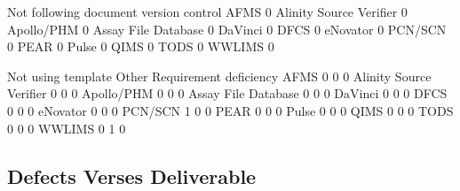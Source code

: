 \documentclass{article}
\begin{document}
\begin{Schunk}
\begin{Soutput}
                          Not following document version control
  AFMS                                                         0
  Alinity Source Verifier                                      0
  Apollo/PHM                                                   0
  Assay File Database                                          0
  DaVinci                                                      0
  DFCS                                                         0
  eNovator                                                     0
  PCN/SCN                                                      0
  PEAR                                                         0
  Pulse                                                        0
  QIMS                                                         0
  TODS                                                         0
  WWLIMS                                                       0
                         
                          Not using template Other Requirement deficiency
  AFMS                                     0     0                      0
  Alinity Source Verifier                  0     0                      0
  Apollo/PHM                               0     0                      0
  Assay File Database                      0     0                      0
  DaVinci                                  0     0                      0
  DFCS                                     0     0                      0
  eNovator                                 0     0                      0
  PCN/SCN                                  1     0                      0
  PEAR                                     0     0                      0
  Pulse                                    0     0                      0
  QIMS                                     0     0                      0
  TODS                                     0     0                      0
  WWLIMS                                   0     1                      0
\end{Soutput}
\end{Schunk}

\subsection{Defects Verses Deliverable}
\end{document}
